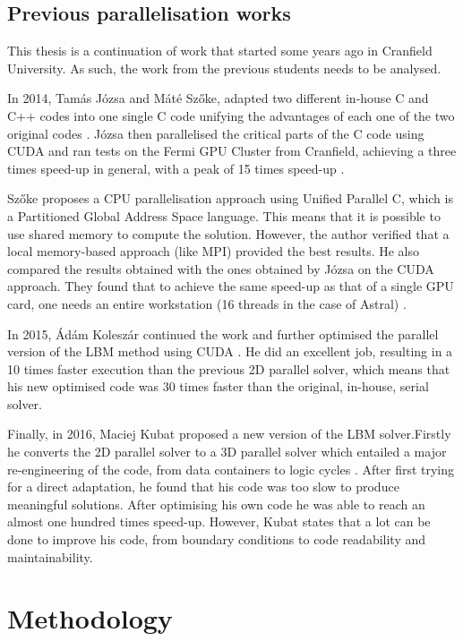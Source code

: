 \documentclass[12pt]{book}
\begin{document}
\section{Previous parallelisation works}
This thesis is a continuation of work that started some years ago in Cranfield University. As such, the work from the previous students needs to be analysed. \par
In 2014, Tamás Józsa and Máté Szőke, adapted two different in-house C and C++ codes into one single C code unifying the advantages of each one of the two original codes \cite{jozsa_thesis,szoke_thesis}. Józsa then parallelised the critical parts of the C code using CUDA and ran tests on the Fermi GPU Cluster from Cranfield, achieving a three times speed-up in general, with a peak of 15 times speed-up \cite{jozsa_thesis}. \par
Szőke proposes a CPU parallelisation approach using Unified Parallel C, which is a Partitioned Global Address Space language\cite{szoke_thesis}. This means that it is possible to use shared memory to compute the solution. However, the author verified that a local memory-based approach (like MPI) provided the best results. He also compared the results obtained with the ones obtained by Józsa on the CUDA approach. They found that to achieve the same speed-up as that of a single GPU card, one needs an entire workstation (16 threads in the case of Astral) \cite{szoke_thesis}.\par
In 2015, Ádám Koleszár continued the work and further optimised the parallel version of the LBM method using CUDA \cite{koleszar_thesis}. He did an excellent job, resulting in a 10 times faster execution than the previous 2D parallel solver, which means that his new optimised code was 30 times faster than the original, in-house, serial solver.\par
Finally, in 2016, Maciej Kubat proposed a new version of the LBM solver.Firstly he converts the 2D parallel solver to a 3D parallel solver which entailed a major re-engineering of the code, from data containers to logic cycles \cite{maciej_thesis}. After first trying for a direct adaptation, he found that his code was too slow to produce meaningful solutions. After optimising his own code he was able to reach an almost one hundred times speed-up.
However, Kubat states that a lot can be done to improve his code, from boundary conditions to code readability and maintainability. 
\chapter{Methodology}
\end{document}

